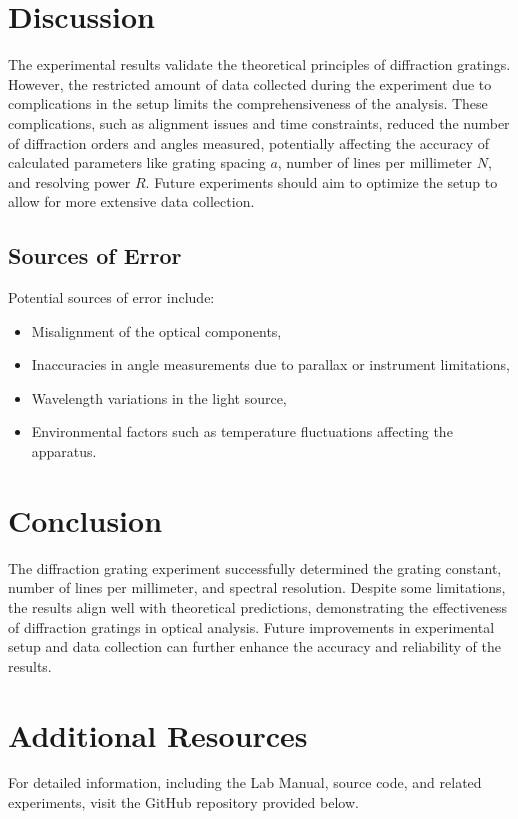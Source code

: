 \documentclass[journal]{IEEEtran}
\begin{document}
\section{Discussion}
The experimental results validate the theoretical principles of diffraction gratings. However, the restricted amount of data collected during the experiment due to complications in the setup limits the comprehensiveness of the analysis. These complications, such as alignment issues and time constraints, reduced the number of diffraction orders and angles measured, potentially affecting the accuracy of calculated parameters like grating spacing $a$, number of lines per millimeter $N$, and resolving power $R$. Future experiments should aim to optimize the setup to allow for more extensive data collection.

\subsection{Sources of Error}
Potential sources of error include:
\begin{itemize}
    \item Misalignment of the optical components,
    \item Inaccuracies in angle measurements due to parallax or instrument limitations,
    \item Wavelength variations in the light source,
    \item Environmental factors such as temperature fluctuations affecting the apparatus.
\end{itemize}

\section{Conclusion}
The diffraction grating experiment successfully determined the grating constant, number of lines per millimeter, and spectral resolution. Despite some limitations, the results align well with theoretical predictions, demonstrating the effectiveness of diffraction gratings in optical analysis. Future improvements in experimental setup and data collection can further enhance the accuracy and reliability of the results.

\section{Additional Resources}
For detailed information, including the Lab Manual, source code, and related experiments, visit the GitHub repository provided below.
\end{document}
